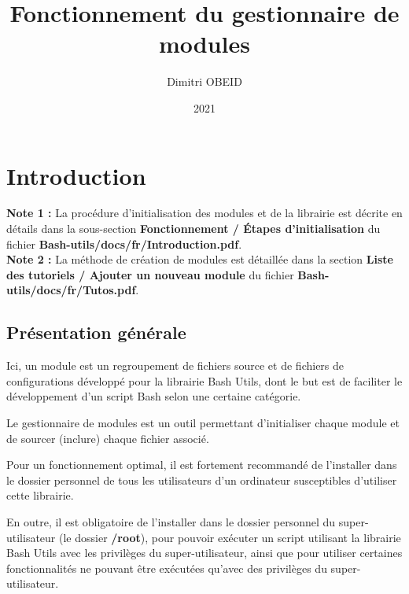 \documentclass[a4paper,10pt]{article}
\title{\color{red}Fonctionnement du gestionnaire de modules}\color{white}
\author{Dimitri OBEID}
\date{2021}
\begin{document}
 \maketitle
 \tableofcontents
 \newpage

 \color{red}
 \section{Introduction}\color{white}

 \textbf{Note 1 :} La procédure d'initialisation des modules et de la librairie est décrite en détails dans la sous-section \textbf{\color{red}Fonctionnement \color{white} / \color{green}Étapes d'initialisation\color{white}} du fichier \textbf{\color{lime}Bash-utils/docs/fr/Introduction.pdf\color{white}}.\\[1\baselineskip]
 
 
 \textbf{Note 2 :} La méthode de création de modules est détaillée dans la section \textbf{\color{red}Liste des tutoriels \color{white} / \color{green}Ajouter un nouveau module} du fichier \textbf{\color{lime}Bash-utils/docs/fr/Tutos.pdf}.
 

 \color{green}
  \subsection{Présentation générale}\color{white}
  Ici, un module est un regroupement de fichiers source et de fichiers de configurations développé pour la librairie Bash Utils, dont le but est de faciliter le développement d'un script Bash selon une certaine catégorie.\linebreak

  Le gestionnaire de modules est un outil permettant d'initialiser chaque module et de sourcer (inclure) chaque fichier associé.\linebreak

  Pour un fonctionnement optimal, il est fortement recommandé de l'installer dans le dossier personnel de tous les utilisateurs d'un ordinateur susceptibles d'utiliser cette librairie.\linebreak

  En outre, il est obligatoire de l'installer dans le dossier personnel du super-utilisateur (le dossier \textbf{\color{lime}/root\color{white}}), pour pouvoir exécuter un script utilisant la librairie Bash Utils avec les privilèges du super-utilisateur, ainsi que pour utiliser certaines fonctionnalités ne pouvant être exécutées qu'avec des privilèges du super-utilisateur.\\[1\baselineskip]
\end{document}

